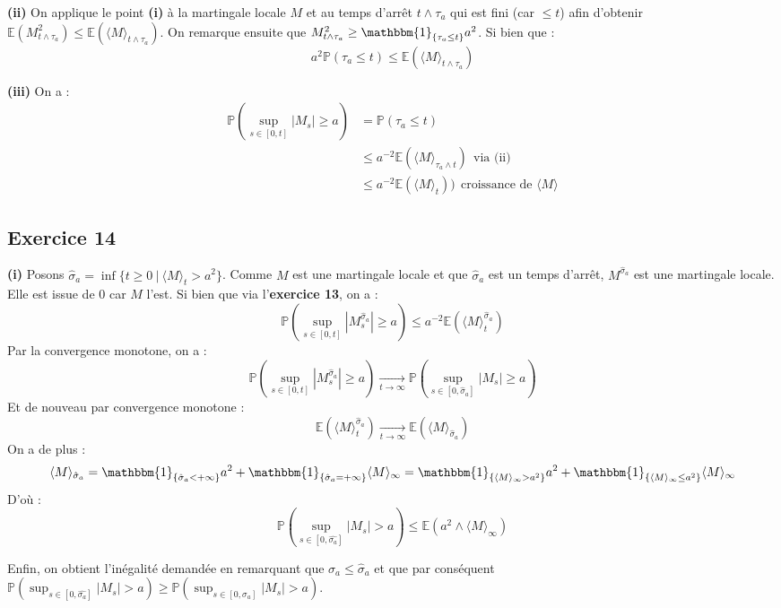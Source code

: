\documentclass[a4paper,12pt]{article}
\newcommand{\E}{\mathbb{E}}
\newcommand{\prob}{\mathbb{P}}
\newcommand{\ind}{\mathbbm{1}}
\begin{document}
\textbf{(ii)} On applique le point \textbf{(i)} à la martingale locale $M$ et au temps d'arrêt $t \wedge \tau_a$ qui est fini (car $\leq t$) afin d'obtenir $\E (M^2_{t \wedge \tau_a}) \leq  \E ( \langle M \rangle_{t \wedge \tau_a})$. On remarque ensuite que $M^2_{t \wedge \tau_a} \geq \ind_{\{ \tau_a \leq t \}} a^2$. Si bien que :
$$a^2 \prob (\tau_a \leq t ) \leq \E (\langle M \rangle_{t \wedge \tau_a})$$ 

\textbf{(iii)} On a :
\begin{align*}
\prob \left( \sup_{s \in [0,t]} |M_s| \geq a \right) & = \prob (\tau_a \leq t) \\
& \leq a^{-2} \E (\langle M \rangle_{\tau_a \wedge t}) \ \ \text{via (ii)} \\
& \leq a^{-2} \E (\langle M \rangle_t ) ) \ \ \text{croissance de } \langle M \rangle
\end{align*}

\subsection{Exercice 14}
\textbf{(i)} Posons $\hat{\sigma}_a = \inf \{t \geq 0 \ | \ \langle M \rangle_t > a^2 \}$. Comme $M$ est une martingale locale et que $\hat{\sigma}_a$ est un temps d'arrêt, $M^{\hat{\sigma}_a}$ est une martingale locale. Elle est issue de $0$ car $M$ l'est. Si bien que via l'\textbf{exercice 13}, on a :
$$\prob \left( \sup_{s \in [0,t]} |M^{\hat{\sigma}_a}_s| \geq a \right) \leq a^{-2} \E (\langle M \rangle^{\hat{\sigma}_a}_{t})$$
Par la convergence monotone, on a : 
$$\prob \left( \sup_{s \in [0,t]} |M^{\hat{\sigma}_a}_s| \geq a \right) \xrightarrow[t \to \infty]{} \prob \left( \sup_{s \in [0,\hat{\sigma}_a]} |M_s| \geq a \right)$$
Et de nouveau par convergence monotone :
$$ \E (\langle M \rangle_t^{\hat{\sigma}_a}) \xrightarrow[t \to \infty]{} \E (\langle M \rangle_{\hat{\sigma}_a})$$
On a de plus : 
$$\langle M \rangle_{\hat{\sigma}_a} = \ind_{\{ \hat{\sigma}_a < + \infty \}} a^2 + \ind_{\{ \hat{\sigma}_a = + \infty \}} \langle M \rangle_{\infty} = \ind_{\{ \langle M \rangle_{\infty} > a^2 \}} a^2 + \ind_{\{ \langle M \rangle_{\infty} \leq a^2\}} \langle M \rangle_{\infty} $$
D'où :
$$\prob \left( \sup_{s \in [0, \hat{\sigma_a}]} |M_s| > a \right) \leq \E (a^2 \wedge \langle M \rangle_{\infty} )$$

Enfin, on obtient l'inégalité demandée en remarquant que $\sigma_a \leq \hat{\sigma}_a$ et que par conséquent $\prob \left( \sup_{s \in [0, \hat{\sigma_a}]} |M_s| > a \right) \geq \prob \left( \sup_{s \in [0, \sigma_a]} |M_s| > a \right)$. \\
\end{document}
